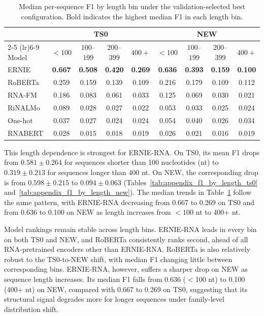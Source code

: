 \documentclass[logo,bsc,singlespacing,parskip]{infthesis}
\begin{document}
\begin{table}[H]
\centering
\small
\setlength{\tabcolsep}{4pt}
\caption{Median per-sequence F1 by length bin under the validation-selected best configuration. Bold indicates the highest median F1 in each length bin.}
\label{tab:median_f1_by_length}
\begin{tabular}{lcccccccc}
\toprule
& \multicolumn{4}{c}{TS0} & \multicolumn{4}{c}{NEW} \\
\cmidrule(lr){2-5} \cmidrule(lr){6-9}
Model & $<100$ & $100$--$199$ & $200$--$399$ & $400+$ & $<100$ & $100$--$199$ & $200$--$399$ & $400+$ \\
\midrule
ERNIE   & \textbf{0.667} & \textbf{0.508} & \textbf{0.420} & \textbf{0.269} & \textbf{0.636} & \textbf{0.393} & \textbf{0.159} & \textbf{0.100} \\
RoBERTa & 0.259 & 0.159 & 0.139 & 0.109 & 0.216 & 0.179 & 0.109 & 0.112 \\
RNA-FM  & 0.186 & 0.083 & 0.061 & 0.033 & 0.125 & 0.069 & 0.030 & 0.021 \\
RiNALMo & 0.089 & 0.028 & 0.027 & 0.022 & 0.053 & 0.033 & 0.025 & 0.024 \\
One-hot & 0.037 & 0.027 & 0.024 & 0.024 & 0.054 & 0.040 & 0.026 & 0.034 \\
RNABERT & 0.028 & 0.015 & 0.018 & 0.019 & 0.026 & 0.021 & 0.016 & 0.019 \\
\bottomrule
\end{tabular}
\end{table}
\vspace{-1.0em}
This length dependence is strongest for ERNIE-RNA.
On TS0, its mean F1 drops from $0.581\pm0.264$ for sequences shorter than 100 nucleotides (nt) to $0.319\pm0.213$ for sequences longer than 400 nt. On NEW, the corresponding drop is from $0.598\pm0.215$ to $0.094\pm0.063$ 
(Tables~\ref{tab:appendix_f1_by_length_ts0} and~\ref{tab:appendix_f1_by_length_new}).
The median trends in Table~\ref{tab:median_f1_by_length} follow the same pattern, with ERNIE-RNA decreasing from 0.667 to 0.269 on TS0 and from 0.636 to 0.100 on NEW as length increases from $<100$ nt to 400+ nt.

Model rankings remain stable across length bins. ERNIE-RNA leads in
every bin on both TS0 and NEW, and RoBERTa consistently ranks second,
ahead of all RNA-pretrained encoders other than ERNIE-RNA. RoBERTa is
also relatively robust to the TS0-to-NEW shift, with median F1 changing
little between corresponding bins. ERNIE-RNA, however, suffers a
sharper drop on NEW as sequence length increases. Its median F1 falls
from 0.636 ($<$100 nt) to 0.100 (400+ nt) on NEW, compared with
0.667 to 0.269 on TS0, suggesting that its structural signal degrades
more for longer sequences under family-level distribution shift.
\end{document}
